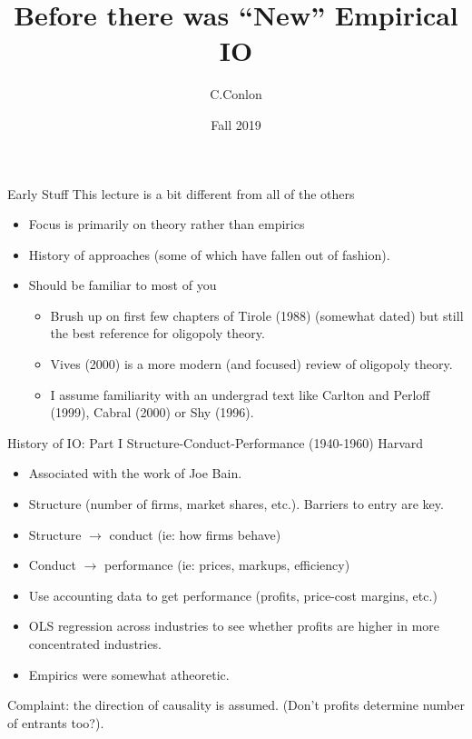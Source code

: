 \documentclass[xcolor=pdftex,dvipsnames,table,mathserif,aspectratio=169]{beamer}
\title [``Old'' IO]{Before there was ``New'' Empirical IO}
\author{C.Conlon}
\institute{Grad IO }
\date{Fall 2019}
\begin{document}
\begin{frame}
\titlepage
\end{frame}

\begin{frame}{Early Stuff}
This lecture is a bit different from all of the others
\begin{itemize}
\item Focus is primarily on theory rather than empirics
\item History of approaches (some of which have fallen out of fashion).
\item Should be familiar to most of you
\begin{itemize}
\item Brush up on first few chapters of Tirole (1988) (somewhat dated) but still the best reference for oligopoly theory.
\item Vives (2000) is a more modern (and focused) review of oligopoly theory.
\item I assume familiarity with an undergrad text like Carlton and Perloff (1999), Cabral (2000) or Shy (1996).
\end{itemize}
\end{itemize}
\end{frame}


\begin{frame}{History of IO: Part I}
Structure-Conduct-Performance (1940-1960) Harvard
\begin{itemize}
\item Associated with the work of Joe Bain.
\item Structure (number of firms, market shares, etc.). Barriers to entry are key.
\item Structure $\rightarrow$ conduct (ie: how firms behave)
\item Conduct $\rightarrow$ performance (ie: prices, markups, efficiency)
\item Use accounting data to get performance (profits, price-cost margins, etc.)
\item OLS regression across industries to see whether profits are higher in more concentrated industries.
\item Empirics were somewhat atheoretic.
\end{itemize}
Complaint: the direction of causality is assumed. (Don't profits determine number of entrants too?).
\end{frame}
\end{document}
